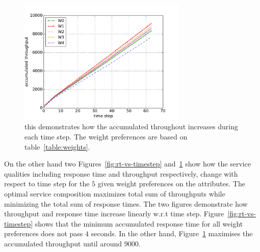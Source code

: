 \documentclass[10pt,journal,compsoc]{IEEEtran}
\begin{document}
\begin{figure}[t]
\includegraphics[width=8cm]{new_graphs/trough_step_all++.pdf}
\caption{this demonstrates how the accumulated throughout increases during each time step. The weight preferences are based on table~\ref{table:weights}.}
\centering
\label{fig:trput-vs-timestep}
\end{figure} 

On the other hand two Figures~\ref{fig:rt-vs-timestep} and~\ref{fig:trput-vs-timestep} show how the service qualities including response time and throughput respectively, change with respect to time step for the $5$ given weight preferences on the attributes. The optimal service composition maximizes total sum of throughputs while minimizing the total sum of response times. The two figures demonstrate how throughput and response time increase linearly w.r.t time step. Figure~\ref{fig:rt-vs-timestep} shows that the minimum accumulated response time for all weight preferences does not pass $4$ seconds. In the other hand, Figure~\ref{fig:trput-vs-timestep} maximises the accumulated throughput until around $9000$. 
\end{document}
